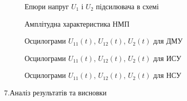\documentclass[14pt,a4paper]{scrartcl}
\begin{document}
\begin{figure}[!h]
  { %
   \caption{Епюри напруг $U_1$ і $U_2$ підсилювача в схемі}
  }
  \end{figure}


\begin{figure}[h]
\caption{Амплітудна характеристика НМП}
\end{figure}
\newpage
\begin{figure}[h]
\caption{Осцилограми $U_{11}(t)$, $U_{12}(t)$, $U_2(t)$ для ДМУ}
\end{figure}

\begin{figure}[h]
\caption{Осцилограми $U_{11}(t)$, $U_{12}(t)$, $U_2(t)$ для ИСУ}
\end{figure}


\begin{figure}[h]
\caption{Осцилограми $U_{11}(t)$, $U_{12}(t)$, $U_2(t)$ для НСУ}
\end{figure}

\newpage
\begin{center}
{\Large 7.Аналіз результатів та висновки}
\end{center}






\end{document}
